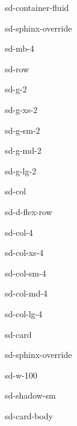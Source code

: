 \documentclass[letterpaper,10pt,italian]{jupyterBook}
\begin{document}
\begin{sphinxuseclass}{sd-container-fluid}
\begin{sphinxuseclass}{sd-sphinx-override}
\begin{sphinxuseclass}{sd-mb-4}
\begin{sphinxuseclass}{sd-row}
\begin{sphinxuseclass}{sd-g-2}
\begin{sphinxuseclass}{sd-g-xs-2}
\begin{sphinxuseclass}{sd-g-sm-2}
\begin{sphinxuseclass}{sd-g-md-2}
\begin{sphinxuseclass}{sd-g-lg-2}
\begin{sphinxuseclass}{sd-col}
\begin{sphinxuseclass}{sd-d-flex-row}
\begin{sphinxuseclass}{sd-col-4}
\begin{sphinxuseclass}{sd-col-xs-4}
\begin{sphinxuseclass}{sd-col-sm-4}
\begin{sphinxuseclass}{sd-col-md-4}
\begin{sphinxuseclass}{sd-col-lg-4}
\begin{sphinxuseclass}{sd-card}
\begin{sphinxuseclass}{sd-sphinx-override}
\begin{sphinxuseclass}{sd-w-100}
\begin{sphinxuseclass}{sd-shadow-sm}
\begin{sphinxuseclass}{sd-card-body}
\end{sphinxuseclass}
\end{sphinxuseclass}
\end{sphinxuseclass}
\end{sphinxuseclass}
\end{sphinxuseclass}
\end{sphinxuseclass}
\end{sphinxuseclass}
\end{sphinxuseclass}
\end{sphinxuseclass}
\end{sphinxuseclass}
\end{sphinxuseclass}
\end{sphinxuseclass}
\end{sphinxuseclass}
\end{sphinxuseclass}
\end{sphinxuseclass}
\end{sphinxuseclass}
\end{sphinxuseclass}
\end{sphinxuseclass}
\end{sphinxuseclass}
\end{sphinxuseclass}
\end{sphinxuseclass}
\sphinxstepscope
\end{document}
